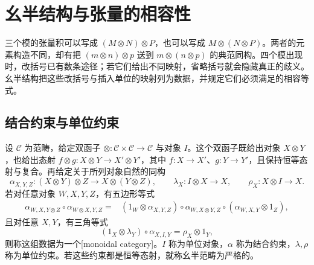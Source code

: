 
\section{幺半结构与张量的相容性}
\label{b4:sec:monoidal-structure}

三个模的张量积可以写成 \((M\otimes N)\otimes P\)，也可以写成 \(M\otimes(N\otimes P)\)。两者的元素构造不同，却有把 \((m\otimes n)\otimes p\) 送到 \(m\otimes(n\otimes p)\) 的典范同构。四个模出现时，改括号已有数条途径；若它们给出不同映射，省略括号就会隐藏真正的歧义。幺半结构把这些改括号与插入单位的映射列为数据，并规定它们必须满足的相容等式。

\subsection{结合约束与单位约束}
\label{b4:subsec:monoidal-constraints}

\begin{definition}\label{b4:def:monoidal-category}
	设 \(\mathcal C\) 为范畴，给定双函子 \(\otimes:\mathcal C\times\mathcal C\to\mathcal C\) 与对象 \(I\)。这个双函子既给出对象 \(X\otimes Y\)，也给出态射 \(f\otimes g:X\otimes Y\to X'\otimes Y'\)，其中 \(f:X\to X'\)、\(g:Y\to Y'\)，且保持恒等态射与复合。再给定关于所列对象自然的同构
	\[
		\alpha_{X,Y,Z}:(X\otimes Y)\otimes Z\longrightarrow X\otimes(Y\otimes Z), \qquad \lambda_X:I\otimes X\longrightarrow X, \qquad \rho_X:X\otimes I\longrightarrow X.
	\]
	若对任意对象 \(W,X,Y,Z\)，有五边形等式
	\begin{equation}\label{b4:eq:monoidal-pentagon}
		\begin{aligned}
			\alpha_{W,X,Y\otimes Z}\circ\alpha_{W\otimes X,Y,Z} ={}&(1_W\otimes\alpha_{X,Y,Z})\circ\alpha_{W,X\otimes Y,Z} \circ(\alpha_{W,X,Y}\otimes1_Z),
		\end{aligned}
	\end{equation}
	且对任意 \(X,Y\)，有三角等式
	\begin{equation}\label{b4:eq:monoidal-triangle}
		(1_X\otimes\lambda_Y)\circ\alpha_{X,I,Y} =\rho_X\otimes1_Y,
	\end{equation}
	则称这组数据为一个[monoidal category]。\(I\) 称为单位对象，\(\alpha\) 称为结合约束，\(\lambda,\rho\) 称为单位约束。若这些约束都是恒等态射，就称幺半范畴为严格的。
\end{definition}

